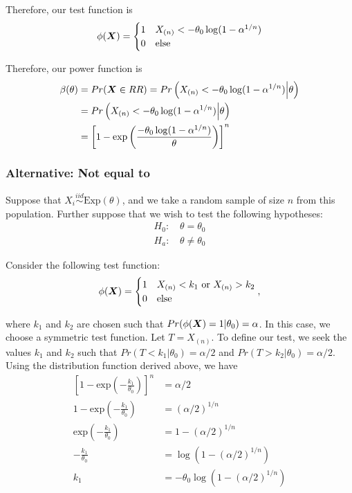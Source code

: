 \documentclass[]{article}
\newcommand{\bfX}{\mbox{\boldmath $X$}}
\begin{document}
Therefore, our test function is
\[
\phi(\bfX) = \begin{cases}
1 & X_{(n)} < -\theta_0\log(1 - \alpha^{1/n}) \\
0 & \text{else}
\end{cases}
\]

Therefore, our power function is
\[
\begin{split}
\beta(\theta) &= Pr(\bfX \in RR) = Pr\left(X_{(n)} < -\theta_0\log(1 - \alpha^{1/n}) \Big| \theta\right) \\
&= Pr\left(X_{(n)} < -\theta_0\log(1 - \alpha^{1/n}) \Big| \theta\right) \\
&= \left[1 - \text{exp}\left(\frac{-\theta_0\log(1 - \alpha^{1/n})}{\theta}\right)\right]^n
\end{split}
\]

\subsubsection{Alternative: Not equal to}

Suppose that $X_i \stackrel{iid}{\sim} \text{Exp}(\theta)$, and we take a random sample of size $n$ from this population. Further suppose that we wish to test the following hypotheses:
\[
\begin{split}
\text{$H_0$: }& \theta = \theta_0 \\
\text{$H_a$: }& \theta \neq \theta_0
\end{split}
\]

Consider the following test function:
\[
\phi(\bfX) = \begin{cases}
1 & X_{(n)} < k_1 \text{ or } X_{(n)} > k_2 \\
0 & \text{else}
\end{cases},
\]

where $k_1$ and $k_2$ are chosen such that $Pr(\phi(\bfX) = 1|\theta_0) = \alpha$. In this case, we choose a symmetric test function. Let $T = X_{(n)}$. To define our test, we seek the values $k_1$ and $k_2$ such that $Pr(T < k_1 | \theta_0) = \alpha/2$ and $Pr(T > k_2 | \theta_0) = \alpha/2$. Using the distribution function derived above, we have
\[
\begin{split}
\left[1 - \text{exp}(-\frac{k_1}{\theta_0})\right]^n &= \alpha/2 \\
1 - \text{exp}(-\frac{k_1}{\theta_0}) &= (\alpha/2)^{1/n} \\
\text{exp}(-\frac{k_1}{\theta_0}) &= 1 - (\alpha/2)^{1/n} \\
-\frac{k_1}{\theta_0} &= \log(1 - (\alpha/2)^{1/n}) \\
k_1 &= -\theta_0\log(1 - (\alpha/2)^{1/n})
\end{split}
\]
\end{document}
